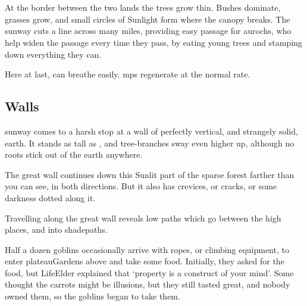 \section{}
\label{sunway}

At the border between the two lands the trees grow thin.
Bushes dominate, grasses grow, and small circles of Sunlight form where the canopy breaks.
The \gls{sunway} cuts a line across many miles, providing easy passage for aurochs, who help widen the passage every time they pass, by eating young trees and stamping down everything they can.

Here at last,  can breathe easily.
\Glspl{mp} regenerate at the normal rate.


\begin{multicols}{2}

\subsection{ Walls}

\begin{boxtext}
  \Gls{sunway} comes to a harsh stop at a wall of perfectly vertical, and strangely solid, earth.
  It stands as tall as , and tree-branches sway even higher up, although no roots stick out of the earth anywhere.

  The great wall continues down this Sunlit part of the sparse forest farther than you can see, in both directions.
  But it also has crevices, or cracks, or some darkness dotted along it.
\end{boxtext}

Travelling along the great wall reveals low paths which go between the high places, and into \gls{shadepaths}.

Half a dozen goblins occasionally arrive with ropes, or climbing equipment, to enter \gls{plateauGardens} above and take some food.
Initially, they asked for the food, but \gls{LifeElder} explained that `property is a construct of your mind'.
Some thought the carrots might be illusions, but they still tasted great, and nobody owned them, so the goblins began to take them.

\end{multicols}
